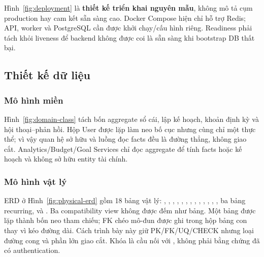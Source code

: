 
Hình~\ref{fig:deployment} là \textbf{thiết kế triển khai nguyên mẫu}, không mô tả cụm production hay cam kết sẵn sàng cao. Docker Compose hiện chỉ hỗ trợ Redis; API, worker và PostgreSQL cần được khởi chạy/cấu hình riêng. Readiness phải tách khỏi liveness để backend không được coi là sẵn sàng khi bootstrap DB thất bại.

\subsection{Thiết kế dữ liệu}

\subsubsection{Mô hình miền}


Hình~\ref{fig:domain-class} tách bốn aggregate sổ cái, lập kế hoạch, khoản định kỳ và hội thoại--phản hồi. Hộp User được lặp làm neo bố cục nhưng cùng chỉ một thực thể; vì vậy quan hệ sở hữu và luồng đọc facts đều là đường thẳng, không giao cắt. Analytics/Budget/Goal Services chỉ đọc aggregate để tính facts hoặc kế hoạch và không sở hữu entity tài chính.

\subsubsection{Mô hình vật lý}


ERD ở Hình~\ref{fig:physical-erd} gồm 18 bảng vật lý: , , , , , , , , , , , , , ba bảng recurring,  và . Ba compatibility view không được đếm như bảng. Một bảng  được lặp thành bốn neo tham chiếu; FK chéo mô-đun được ghi trong hộp bảng con thay vì kéo đường dài. Cách trình bày này giữ PK/FK/UQ/CHECK nhưng loại đường cong và phần lớn giao cắt. Khóa  là cầu nối với , không phải bằng chứng đã có authentication.

